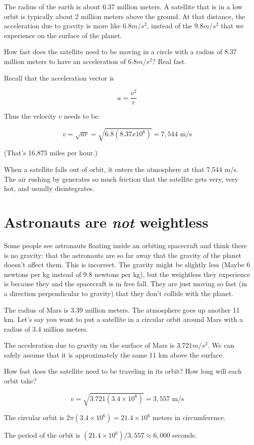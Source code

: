 The radius of the earth is about 6.37 million meters. A satellite that
is in a low orbit is typically about 2 million meters above the
ground. At that distance, the acceleration due to gravity is more like
$6.8 m/s^2$, instead of the $9.8 m/s^2$ that we experience on the
surface of the planet.

How fast does the satellite need to be moving in a circle with a
radius of 8.37 million meters to have an acceleration of $6.8 m/s^2$? Real fast.

Recall that the acceleration vector is

$$a = \frac{v^2}{r}$$

Thus the velocity $v$ needs to be:

$$v = \sqrt{a r} = \sqrt{6.8(8.37 x 10^6)} = 7,544 \text{ m/s}$$

(That's 16,875 miles per hour.)

When a satellite falls out of orbit, it enters the atmosphere at that
7,544 m/s.  The air rushing by generates so much friction that the
satellite gets very, very hot, and usually disintegrates.

\section{Astronauts are \emph{not} weightless}

Some people see astronauts floating inside an orbiting spacecraft and
think there is no gravity: that the astronauts are so far away that
the gravity of the planet doesn't affect them. This is incorrect.  The
gravity might be slightly less (Maybe 6 newtons per kg instead of 9.8
newtons per kg), but the weightless they experience is because they
and the spacecraft is in free fall.  They are just moving so fast (in
a direction perpendicular to gravity) that they don't collide with the
planet.



\begin{Exercise}[title={Mars Orbit}, label=mars_orbit]
  
  The radius of Mars is 3.39 million meters. The atmosphere goes up
  another 11 km.  Let's say you want to put a satellite in a circular
  orbit around Mars with a radius of 3.4 million meters.

  The acceleration due to gravity on the surface of Mars is $3.721
  m/s^2$. We can safely assume that it is approximately the same 11 km
  above the surface.

  How fast does the satellite need to be traveling in its orbit?  How
  long will each orbit take?

\end{Exercise}
\begin{Answer}[ref=circular]
  $$v = \sqrt{3.721(3.4 \times 10^6)} = 3,557\text{ m/s}$$

  The circular orbit is $2\pi(3.4 \times 10^6) = 21.4 \times 10^6$ meters in circumference.

  The period of the orbit is $(21.4 \times 10^6)/3,557 \approx 6,000$ seconds.
\end{Answer}

